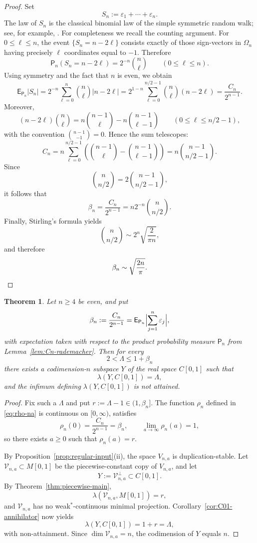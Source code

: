 \documentclass[11pt]{amsart}
\numberwithin{equation}{section}
\newtheorem{theorem}{Theorem}[section]
\theoremstyle{definition}
\theoremstyle{remark}
\newcommand{\Exp}{\mathsf E}
\newcommand{\Prob}{\mathsf P}
\begin{document}
\begin{proof}
Set
\[
S_n:=\varepsilon_1+\cdots+\varepsilon_n.
\]
The law of $S_n$ is the classical binomial law of the simple symmetric random walk; see, for example, \cite[Chapter~III, Section~2]{Feller}. For completeness we recall the counting argument. For $0\leqslant \ell\leqslant n$, the event $\{S_n=n-2\ell\}$ consists exactly of those sign-vectors in $\Omega_n$ having precisely $\ell$ coordinates equal to $-1$. Therefore
\[
\Prob_n(S_n=n-2\ell)=2^{-n}\binom n\ell
\qquad (0\leqslant \ell\leqslant n).
\]
Using symmetry and the fact that $n$ is even, we obtain
\[
\Exp_{\Prob_n}|S_n|
=
2^{-n}\sum_{\ell=0}^n \binom n\ell |n-2\ell|
=
2^{1-n}\sum_{\ell=0}^{n/2-1} \binom n\ell (n-2\ell)
=
\frac{C_n}{2^{n-1}}.
\]
Moreover,
\[
(n-2\ell)\binom n\ell
=
n\binom{n-1}{\ell}
-
n\binom{n-1}{\ell-1}
\qquad (0\leqslant \ell\leqslant n/2-1),
\]
with the convention $\binom{n-1}{-1}=0$. Hence the sum telescopes:
\[
C_n
=
n\sum_{\ell=0}^{n/2-1}
\left(
\binom{n-1}{\ell}-\binom{n-1}{\ell-1}
\right)
=
n\binom{n-1}{n/2-1}.
\]
Since
\[
\binom{n}{n/2}=2\binom{n-1}{n/2-1},
\]
it follows that
\[
\beta_n=\frac{C_n}{2^{n-1}}=n2^{-n}\binom{n}{n/2}.
\]
Finally, Stirling's formula yields
\[
\binom{n}{n/2}\sim 2^n\sqrt{\frac{2}{\pi n}},
\]
and therefore
\[
\beta_n\sim \sqrt{\frac{2n}{\pi}}.
\qedhere
\]
\end{proof}

\begin{theorem}
\label{thm:even-codim}
Let $n\geqslant 4$ be even, and put
\[
\beta_n:=\frac{C_n}{2^{n-1}}=\Exp_{\Prob_n}\Bigl|\sum_{j=1}^n \varepsilon_j\Bigr|,
\]
with expectation taken with respect to the product probability measure $\Prob_n$ from Lemma~\ref{lem:Cn-rademacher}. Then for every
\[
2<\Lambda\leqslant 1+\beta_n
\]
there exists a codimension-$n$ subspace $Y$ of the real space $C[0,1]$ such that
\[
\lambda(Y,C[0,1])=\Lambda,
\]
and the infimum defining $\lambda(Y,C[0,1])$ is not attained.
\end{theorem}

\begin{proof}
Fix such a $\Lambda$ and put $r:=\Lambda-1\in(1,\beta_n]$. The function $\rho_n$ defined in \eqref{eq:rho-na} is continuous on $[0,\infty)$, satisfies
\[
\rho_n(0)=\frac{C_n}{2^{n-1}}=\beta_n,
\qquad
\lim_{a\to\infty}\rho_n(a)=1,
\]
so there exists $a\geqslant 0$ such that $\rho_n(a)=r$.

By Proposition~\ref{prop:regular-input}\textup{(ii)}, the space $V_{n,a}$ is duplication-stable. Let $\mathscr V_{n,a}\subset M[0,1]$ be the piecewise-constant copy of $V_{n,a}$, and let
\[
Y:=\mathscr V_{n,a}^{\perp}\subset C[0,1].
\]
By Theorem~\ref{thm:piecewise-main},
\[
\lambda(\mathscr V_{n,a},M[0,1]) = r,
\]
and $\mathscr V_{n,a}$ has no weak$^*$-continuous minimal projection. Corollary~\ref{cor:C01-annihilator} now yields
\[
\lambda(Y,C[0,1])=1+r=\Lambda,
\]
with non-attainment. Since $\dim \mathscr V_{n,a}=n$, the codimension of $Y$ equals $n$.
\end{proof}
\end{document}
